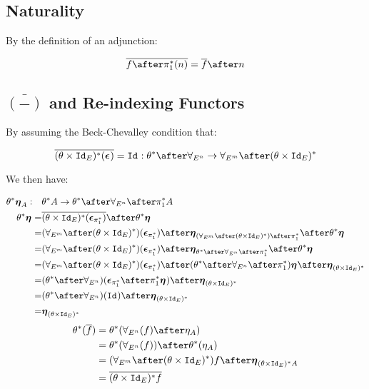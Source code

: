     \subsection{Naturality}
    By the definition of an adjunction:
    
    \begin{equation}
        \bar{f\after\pstar(n)} = \bar{f}\after n
    \end{equation}
    
    \subsection{$\bar{(-)}$ and Re-indexing Functors}
    By assuming the Beck-Chevalley condition that:
    
    \begin{equation}
        \bar{(\theta\times\Id{E})\star(\counit{})} = \Id{}: \theta\star\after\allEn \rightarrow \allEm\after(\theta\times\Id{E})\star
    \end{equation}
    
    We then have:
    
    \begin{align*}
        \theta\star\unit{A}:\quad&\theta\star A \rightarrow \theta\star\after\allEn\after\pstar A\\
        \theta\star\unit{} =& \bar{(\theta\times\Id{E})\star(\counit{\pstar})}\after\theta\star\unit{}\\
        =& (\allEm\after(\theta\times\Id{E})\star)(\counit{\pstar})\after\unit{(\allEm\after(\theta\times\Id{E})\star)\after\pstar}\after\theta\star\unit{}\\
        = & (\allEm\after(\theta\times\Id{E})\star)(\counit{\pstar})\after\unit{\theta\star\after\allEn\after\pstar}\after\theta\star\unit{}\\
        = & (\allEm\after(\theta\times\Id{E})\star)(\counit{\pstar}) \after(\theta\star\after\allEn\after\pstar)\unit{} \after\unit{(\theta\times\Id{E})\star}\\
        = & (\theta\star\after\allEn)(\counit{\pstar}
        \after\pstar\unit{})\after\unit{(\theta\times\Id{E})\star}\\
        = & (\theta\star\after\allEn)(\Id{})\after\unit{(\theta\times\Id{E})\star}\\
        = & \unit{(\theta\times\Id{E})\star}
    \end{align*}
    \begin{align*}
        \theta\star(\bar{f}) & = \theta\star(\allEn(f)\after\eta_A)\\
        & = \theta\star(\allEn(f))\after\theta\star(\eta_A)\\
        & =  (\allEm\after(\theta\times\Id{E})\star)f \after\unit{(\theta\times\Id{E})\star A}\\
        & = \bar{(\theta\times\Id{E})\star f}\\
    \end{align*}
    
